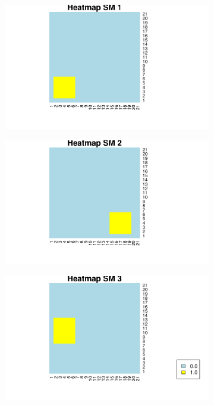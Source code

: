 \documentclass[11pt]{article}
\begin{document}
\begin{figure}[t]
\begin{subfigure}{.35\textwidth}
  \includegraphics[width=.95\linewidth]{plots/SM1plot.pdf}
  \label{fig:sub1}
\end{subfigure}%
 \begin{subfigure}{.35\textwidth}
  \includegraphics[width=.95\linewidth]{plots/SM2plot.pdf}
  \label{fig:sub1}
\end{subfigure}%
 \begin{subfigure}{.35\textwidth}
  \includegraphics[width=.95\linewidth]{plots/SM3plot_legend.pdf}
  \label{fig:sub1}
\end{subfigure}%
\end{figure}
\end{document}
